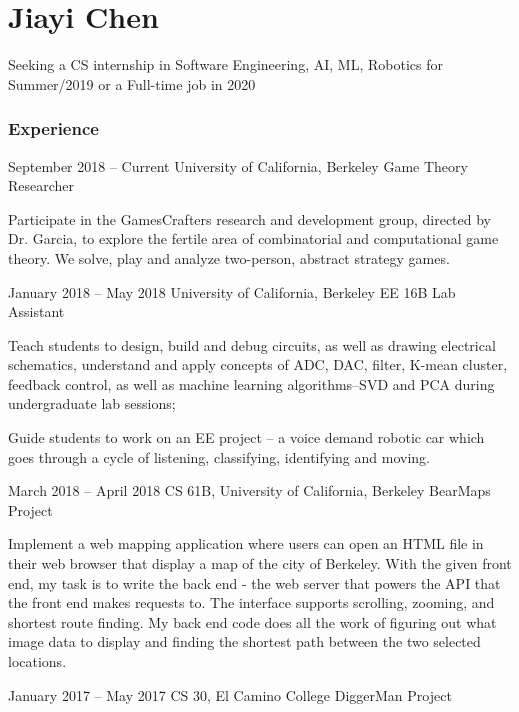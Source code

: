\documentclass{tccv}
\begin{document}
\part{Jiayi Chen}
     {Seeking a CS internship in Software Engineering, AI, ML, Robotics for Summer/2019 or a Full-time job in 2020}
\section{Experience}

\begin{eventlist}

\item{September 2018 -- Current}
     {University of California, Berkeley}
     {Game Theory Researcher}

Participate in the GamesCrafters research and development group, directed by Dr. Garcia, to explore the fertile area of combinatorial and computational game theory. We solve, play and analyze two-person, abstract strategy games.

\item{January 2018 -- May 2018}
     {University of California, Berkeley}
     {EE 16B Lab Assistant}
     
Teach students to design, build and debug circuits, as well as drawing electrical schematics, understand and apply concepts of ADC, DAC, filter, K-mean cluster, feedback control, as well as machine learning algorithms--SVD and PCA during undergraduate lab sessions;

Guide students to work on an EE project -- a voice demand robotic car which goes through a cycle of listening, classifying, identifying and moving.


\item{March 2018 -- April 2018}
     {CS 61B, University of California, Berkeley}
     {BearMaps Project}

Implement a web mapping application where users can open an HTML file in their web browser that display a map of the city of Berkeley. With the given front end, my task is to write the back end - the web server that powers the API that the front end makes requests to. The interface supports scrolling, zooming, and shortest route finding. My back end code does all the work of figuring out what image data to display and finding the shortest path between the two selected locations.

\item{January 2017 -- May 2017}
     {CS 30, El Camino College}
     {DiggerMan Project}


\end{eventlist}
\end{document}
